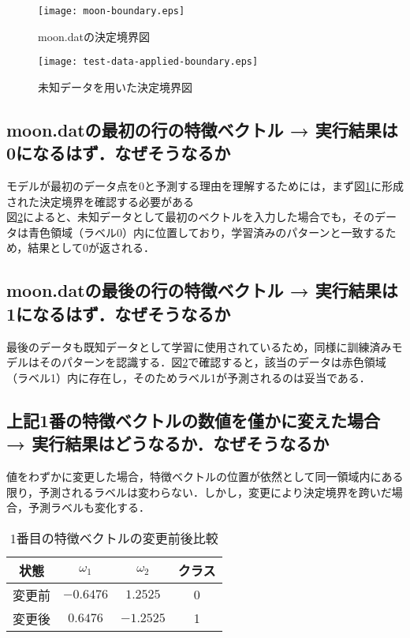 \documentclass[a4j, 10pt]{jarticle}
\begin{document}
\begin{figure}[H]
  \centering
  \texttt{[image: moon-boundary.eps]}
  \caption{moon.datの決定境界図}\label{boundarylinegraph}
\end{figure}

\begin{figure}[H]
  \centering
  \texttt{[image: test-data-applied-boundary.eps]}
  \caption{未知データを用いた決定境界図}\label{boundarylinegraphtestdata}
\end{figure}

\subsection{moon.datの最初の行の特徴ベクトル → 実行結果は0になるはず．なぜそうなるか}
モデルが最初のデータ点を0と予測する理由を理解するためには，まず図\ref{boundarylinegraph}に形成された決定境界を確認する必要がある\\

図\ref{boundarylinegraphtestdata}によると、未知データとして最初のベクトルを入力した場合でも，そのデータは青色領域（ラベル0）内に位置しており，学習済みのパターンと一致するため，結果として0が返される．

\subsection{moon.datの最後の行の特徴ベクトル → 実行結果は1になるはず．なぜそうなるか}
最後のデータも既知データとして学習に使用されているため，同様に訓練済みモデルはそのパターンを認識する．図\ref{boundarylinegraphtestdata}で確認すると，該当のデータは赤色領域（ラベル1）内に存在し，そのためラベル1が予測されるのは妥当である．

\subsection{上記1番の特徴ベクトルの数値を僅かに変えた場合 → 実行結果はどうなるか．なぜそうなるか}
値をわずかに変更した場合，特徴ベクトルの位置が依然として同一領域内にある限り，予測されるラベルは変わらない．しかし，変更により決定境界を跨いだ場合，予測ラベルも変化する．
\begin{table}[H]
  \caption{1番目の特徴ベクトルの変更前後比較}\label{first-data-modification}
  \centering
    \begin{tabular}{|c|c|c|c|}
      \hline
      状態 & $\omega_1$ & $\omega_2$ & クラス \\
      \hline
      変更前 & $-0.6476$ & $1.2525$ & 0 \\
      \hline
      変更後 & $0.6476$ & $-1.2525$ & 1 \\
      \hline
    \end{tabular}
\end{table}
\end{document}
